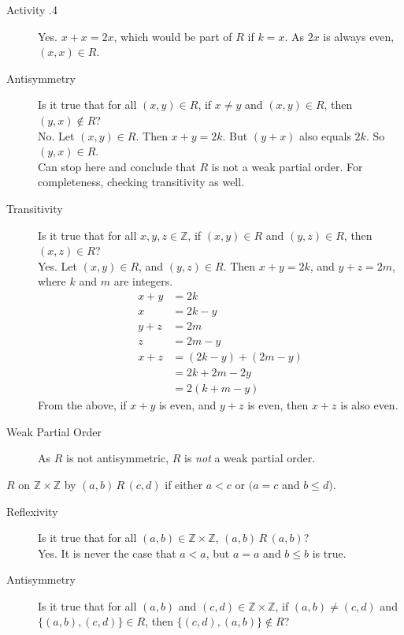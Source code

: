 \documentclass[\main/notes.tex]{subfiles}
\begin{document}
\begin{exercise}{Activity \thechapter.4}
\begin{questions}
\begin{questions}
\begin{answer}
\begin{description}
											Yes. $x + x = 2x$, which would be part of $R$ if $k = x$. As $2x$ is always even, $(x, x) \in R$.
										\item[Antisymmetry] Is it true that for all $(x, y) \in R$, if $x \neq y$ and $(x, y) \in R$, then $(y, x) \notin R$?\\
											No. Let $(x, y) \in R$. Then $x + y = 2k$. But $(y + x)$ also equals $2k$. So $(y, x) \in R$.\\
											Can stop here and conclude that $R$ is not a weak partial order. For completeness, checking transitivity as well.
										\item[Transitivity] Is it true that for all $x, y, z \in \mathbb{Z}$, if $(x, y) \in R$ and $(y, z) \in R$, then $(x, z) \in R$?\\
											Yes. Let $(x, y) \in R$, and $(y, z) \in R$. Then $x + y = 2k$, and $y + z = 2m$, where $k$ and $m$ are integers.
											\begin{align*}
												x + y &= 2k\\
												x &= 2k - y\\
												y + z &= 2m\\
												z &= 2m - y\\
												x + z &= (2k - y) + (2m - y)\\
												&= 2k + 2m - 2y\\
												&= 2(k + m - y)
											\end{align*}
											From the above, if $x + y$ is even, and $y + z$ is even, then $x + z$ is also even.
										\item[Weak Partial Order] As $R$ is not antisymmetric, $R$ is \emph{not} a weak partial order.
									\end{description}
								\end{answer}
								\pagebreak
							\item $R$ on $\mathbb{Z} \times \mathbb{Z}$ by $(a, b) \,R \, (c, d)$ if either $a < c$ or $(a = c$ and $b \leq d)$.
								\begin{answer}
									\begin{description}
										\item[Reflexivity] Is it true that for all $(a, b) \in \mathbb{Z} \times \mathbb{Z}$, $(a, b) \, R \, (a, b)$?\\
											Yes. It is never the case that $a < a$, but $a = a$ and $b \leq b$ is true.
										\item[Antisymmetry] Is it true that for all $(a, b)$ and $(c, d) \in \mathbb{Z} \times \mathbb{Z}$, if $(a, b) \neq (c,d)$ and $\bigl\{(a, b), (c, d)\bigr\} \in R$, then $\bigl\{(c, d), (a, b)\bigr\} \notin R$?\\

\end{description}
\end{answer}
\end{questions}
\end{questions}
\end{exercise}
\end{document}
